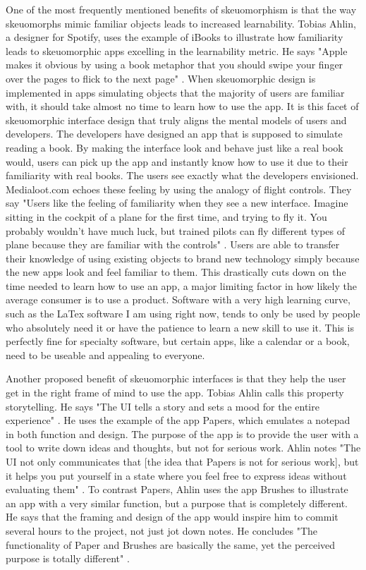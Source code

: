 \documentclass{article}
\begin{document}
	One of the most frequently mentioned benefits of skeuomorphism is that the way skeuomorphs mimic familiar objects leads to increased learnability. Tobias Ahlin, a designer for Spotify, uses the example of iBooks to illustrate how familiarity leads to skeuomorphic apps excelling in the learnability metric. He says "Apple makes it obvious by using a book metaphor that you should swipe your finger over the pages to flick to the next page" \cite{story}. When skeuomorphic design is implemented in apps simulating objects that the majority of users are familiar with, it should take almost no time to learn how to use the app. It is this facet of skeuomorphic interface design that truly aligns the mental models of users and developers. The developers have designed an app that is supposed to simulate reading a book. By making the interface look and behave just like a real book would, users can pick up the app and instantly know how to use it due to their familiarity with real books. The users see exactly what the developers envisioned. Medialoot.com echoes these feeling by using the analogy of flight controls. They say "Users like the feeling of familiarity when they see a new interface. Imagine sitting in the cockpit of a plane for the first time, and trying to fly it. You probably wouldn't have much luck, but trained pilots can fly different types of plane because they are familiar with the controls" \cite{media loot}. Users are able to transfer their knowledge of using existing objects to brand new technology simply because the new apps look and feel familiar to them. This drastically cuts down on the time needed to learn how to use an app, a major limiting factor in how likely the average consumer is to use a product. Software with a very high learning curve, such as the LaTex software I am using right now, tends to only be used by people who absolutely need it or have the patience to learn a new skill to use it. This is perfectly fine for specialty software, but certain apps, like a calendar or a book, need to be useable and appealing to everyone.
	
	Another proposed benefit of skeuomorphic interfaces is that they help the user get in the right frame of mind to use the app. Tobias Ahlin calls this property storytelling. He says "The UI tells a story and sets a mood for the entire experience" \cite{story}. He uses the example of the app Papers, which emulates a notepad in both function and design.  The purpose of the app is to provide the user with a tool to write down ideas and thoughts, but not for serious work. Ahlin notes "The UI not only communicates that [the idea that Papers is not for serious work], but it helps you put yourself in a state where you feel free to express ideas without evaluating them" \cite{story}. To contrast Papers, Ahlin uses the app Brushes to illustrate an app with a very similar function, but a purpose that is completely different. He says that the framing and design of the app would inspire him to commit several hours to the project, not just jot down notes. He concludes "The functionality of Paper and Brushes are basically the same, yet the perceived purpose is totally different" \cite{story}.
	
\end{document}
